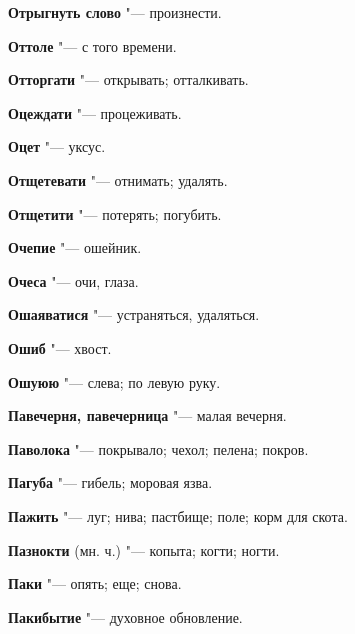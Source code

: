 \begin{mymulticols}{2}
\noindent\textbf{Отрыгнуть слово} "--- произнести. 




\noindent\textbf{Оттоле} "--- с того времени. 




\noindent\textbf{Отторгати} "--- открывать; отталкивать. 




\noindent\textbf{Оцеждати} "--- процеживать. 




\noindent\textbf{Оцет} "--- уксус. 




\noindent\textbf{Отщетевати} "--- отнимать; удалять. 




\noindent\textbf{Отщетити} "--- потерять; погубить. 




\noindent\textbf{Очепие} "--- ошейник. 




\noindent\textbf{Очеса} "--- очи, глаза. 




\noindent\textbf{Ошаяватися} "--- устраняться, удаляться. 




\noindent\textbf{Ошиб} "--- хвост. 




\noindent\textbf{Ошуюю} "--- слева; по левую руку. 









\noindent\textbf{Павечерня, павечерница} "--- малая вечерня. 




\noindent\textbf{Паволока} "--- покрывало; чехол; пелена; покров. 




\noindent\textbf{Пагуба} "--- гибель; моровая язва. 




\noindent\textbf{Пажить} "--- луг; нива; пастбище; поле; корм для скота. 




\noindent\textbf{Пазнокти} (мн. ч.) "--- копыта; когти; ногти. 




\noindent\textbf{Паки} "--- опять; еще; снова. 




\noindent\textbf{Пакибытие} "--- духовное обновление. 





\end{mymulticols}
